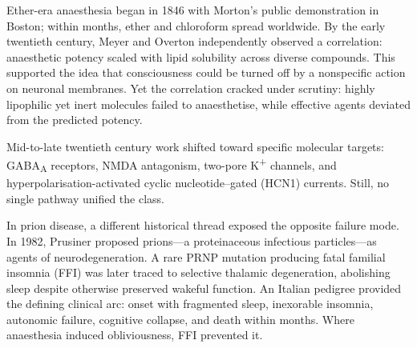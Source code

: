 \begin{historical}
Ether-era anaesthesia began in 1846 with Morton’s public demonstration in Boston; within months, ether and chloroform spread worldwide. By the early twentieth century, Meyer and Overton independently observed a correlation: anaesthetic potency scaled with lipid solubility across diverse compounds. This supported the idea that consciousness could be turned off by a nonspecific action on neuronal membranes. Yet the correlation cracked under scrutiny: highly lipophilic yet inert molecules failed to anaesthetise, while effective agents deviated from the predicted potency.

Mid-to-late twentieth century work shifted toward specific molecular targets: GABA\textsubscript{A} receptors, NMDA antagonism, two-pore K\textsuperscript{+} channels, and hyperpolarisation-activated cyclic nucleotide–gated (HCN1) currents. Still, no single pathway unified the class.

In prion disease, a different historical thread exposed the opposite failure mode. In 1982, Prusiner proposed prions—a proteinaceous infectious particles—as agents of neurodegeneration. A rare PRNP mutation producing fatal familial insomnia (FFI) was later traced to selective thalamic degeneration, abolishing sleep despite otherwise preserved wakeful function. An Italian pedigree provided the defining clinical arc: onset with fragmented sleep, inexorable insomnia, autonomic failure, cognitive collapse, and death within months. Where anaesthesia induced obliviousness, FFI prevented it.

\end{historical}
